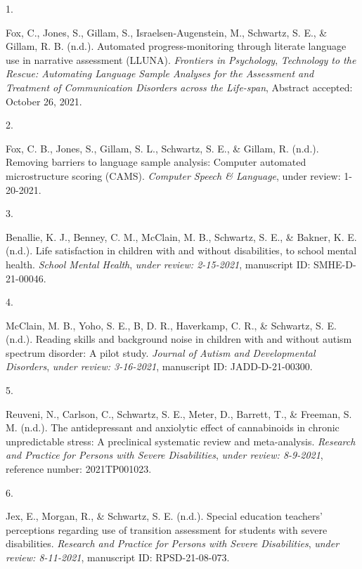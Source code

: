 \documentclass[11pt,a4paper,]{moderncv}
\newlength{\csllabelwidth}
\newcommand{\CSLLeftMargin}[1]{\parbox[t]{\csllabelwidth}{#1}}
\newcommand{\CSLRightInline}[1]{\parbox[t]{\linewidth - \csllabelwidth}{#1}}
\begin{document}
\hypertarget{refs_journalspress}{}
\leavevmode\hypertarget{ref-fox2021}{}%
\CSLLeftMargin{1. }
\CSLRightInline{Fox, C., Jones, S., Gillam, S., Israelsen-Augenstein,
M., Schwartz, S. E., \& Gillam, R. B. (n.d.). Automated
progress-monitoring through literate language use in narrative
assessment (LLUNA). \emph{Frontiers in Psychology}, \emph{Technology to
the Rescue: Automating Language Sample Analyses for the Assessment and
Treatment of Communication Disorders across the Life-span}, Abstract
accepted: October 26, 2021.}

\leavevmode\hypertarget{ref-Orellana2021}{}%
\CSLLeftMargin{2. }
\CSLRightInline{Fox, C. B., Jones, S., Gillam, S. L., Schwartz, S. E.,
\& Gillam, R. (n.d.). Removing barriers to language sample analysis:
Computer automated microstructure scoring (CAMS). \emph{Computer Speech
\& Language}, under review: 1-20-2021.}

\leavevmode\hypertarget{ref-Benallie2021life}{}%
\CSLLeftMargin{3. }
\CSLRightInline{Benallie, K. J., Benney, C. M., McClain, M. B.,
Schwartz, S. E., \& Bakner, K. E. (n.d.). Life satisfaction in children
with and without disabilities, to school mental health. \emph{School
Mental Health}, \emph{under review: 2-15-2021}, manuscript ID:
SMHE-D-21-00046.}

\leavevmode\hypertarget{ref-mcclain2021noise}{}%
\CSLLeftMargin{4. }
\CSLRightInline{McClain, M. B., Yoho, S. E., B, D. R., Haverkamp, C. R.,
\& Schwartz, S. E. (n.d.). Reading skills and background noise in
children with and without autism spectrum disorder: A pilot study.
\emph{Journal of Autism and Developmental Disorders}, \emph{under
review: 3-16-2021}, manuscript ID: JADD-D-21-00300.}

\leavevmode\hypertarget{ref-Reuveni2021cannabinoids}{}%
\CSLLeftMargin{5. }
\CSLRightInline{Reuveni, N., Carlson, C., Schwartz, S. E., Meter, D.,
Barrett, T., \& Freeman, S. M. (n.d.). The antidepressant and anxiolytic
effect of cannabinoids in chronic unpredictable stress: A preclinical
systematic review and meta-analysis. \emph{Research and Practice for
Persons with Severe Disabilities}, \emph{under review: 8-9-2021},
reference number: 2021TP001023.}

\leavevmode\hypertarget{ref-jex2021}{}%
\CSLLeftMargin{6. }
\CSLRightInline{Jex, E., Morgan, R., \& Schwartz, S. E. (n.d.). Special
education teachers' perceptions regarding use of transition assessment
for students with severe disabilities. \emph{Research and Practice for
Persons with Severe Disabilities}, \emph{under review: 8-11-2021},
manuscript ID: RPSD-21-08-073.}
\end{document}
